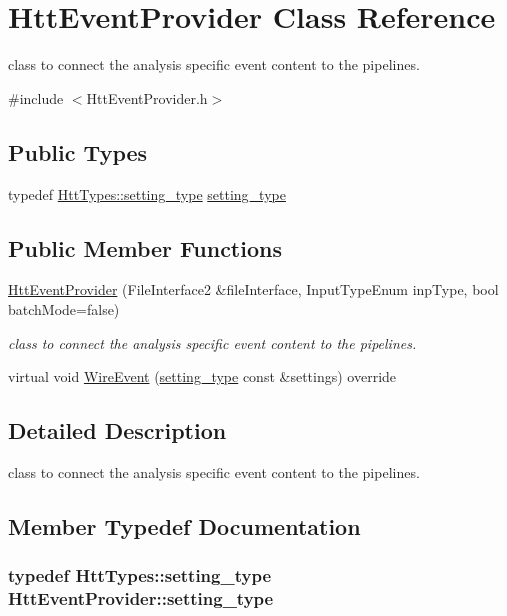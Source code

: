 \hypertarget{classHttEventProvider}{
\section{HttEventProvider Class Reference}
\label{classHttEventProvider}
}


class to connect the analysis specific event content to the pipelines.  


{\ttfamily \#include $<$HttEventProvider.h$>$}\subsection*{Public Types}
\begin{DoxyCompactItemize}
\item 
typedef \hyperlink{classHttSettings}{HttTypes::setting\_\-type} \hyperlink{classHttEventProvider_aa8f9c2ea082dbbae33d53a0b3ef1f995}{setting\_\-type}
\end{DoxyCompactItemize}
\subsection*{Public Member Functions}
\begin{DoxyCompactItemize}
\item 
\hyperlink{classHttEventProvider_a74ad1777d344d990c91785c66fa9a952}{HttEventProvider} (FileInterface2 \&fileInterface, InputTypeEnum inpType, bool batchMode=false)
\begin{DoxyCompactList}\small\item\em class to connect the analysis specific event content to the pipelines. \item\end{DoxyCompactList}\item 
virtual void \hyperlink{classHttEventProvider_a6f1f9729b3200ed6af1bec40ddae060a}{WireEvent} (\hyperlink{classHttSettings}{setting\_\-type} const \&settings) override
\end{DoxyCompactItemize}


\subsection{Detailed Description}
class to connect the analysis specific event content to the pipelines. 

\subsection{Member Typedef Documentation}
\hypertarget{classHttEventProvider_aa8f9c2ea082dbbae33d53a0b3ef1f995}{
\subsubsection[{setting\_\-type}]{\setlength{\rightskip}{0pt plus 5cm}typedef {\bf HttTypes::setting\_\-type} {\bf HttEventProvider::setting\_\-type}}}
\label{classHttEventProvider_aa8f9c2ea082dbbae33d53a0b3ef1f995}


